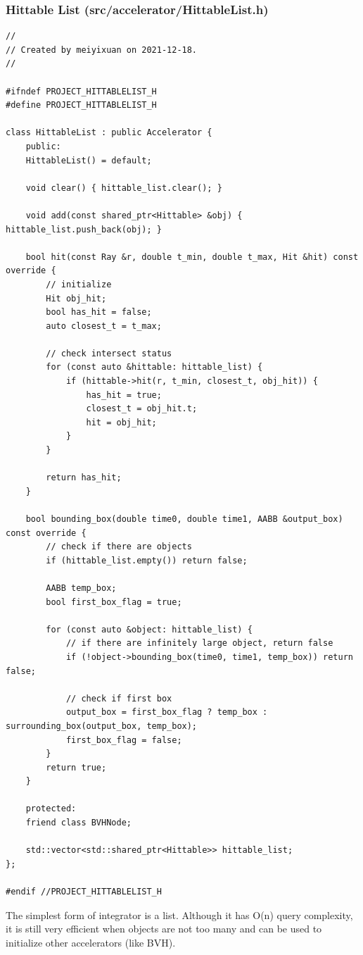 \documentclass[utf8]{article}
\begin{document}
\subsubsection{Hittable List (src/accelerator/HittableList.h)}
\begin{lstlisting}[style=CStyle]
//
// Created by meiyixuan on 2021-12-18.
//

#ifndef PROJECT_HITTABLELIST_H
#define PROJECT_HITTABLELIST_H

class HittableList : public Accelerator {
	public:
	HittableList() = default;
	
	void clear() { hittable_list.clear(); }
	
	void add(const shared_ptr<Hittable> &obj) { hittable_list.push_back(obj); }
	
	bool hit(const Ray &r, double t_min, double t_max, Hit &hit) const override {
		// initialize
		Hit obj_hit;
		bool has_hit = false;
		auto closest_t = t_max;
		
		// check intersect status
		for (const auto &hittable: hittable_list) {
			if (hittable->hit(r, t_min, closest_t, obj_hit)) {
				has_hit = true;
				closest_t = obj_hit.t;
				hit = obj_hit;
			}
		}
		
		return has_hit;
	}
	
	bool bounding_box(double time0, double time1, AABB &output_box) const override {
		// check if there are objects
		if (hittable_list.empty()) return false;
		
		AABB temp_box;
		bool first_box_flag = true;
		
		for (const auto &object: hittable_list) {
			// if there are infinitely large object, return false
			if (!object->bounding_box(time0, time1, temp_box)) return false;
			
			// check if first box
			output_box = first_box_flag ? temp_box : surrounding_box(output_box, temp_box);
			first_box_flag = false;
		}
		return true;
	}
	
	protected:
	friend class BVHNode;
	
	std::vector<std::shared_ptr<Hittable>> hittable_list;
};

#endif //PROJECT_HITTABLELIST_H

\end{lstlisting}
The simplest form of integrator is a list. Although it has O(n) query complexity, it is still very efficient when objects are not too many and can be used to initialize other accelerators (like BVH).
\end{document}
